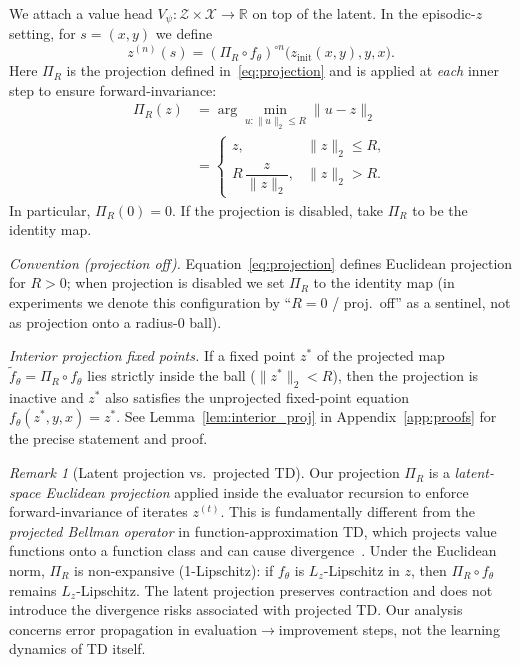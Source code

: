 \documentclass{article}
\theoremstyle{plain}
\theoremstyle{definition}
\theoremstyle{remark}
\newtheorem{remark}[theorem]{Remark}
\newcommand{\R}{\mathbb{R}}
\newcommand{\XX}{\mathcal{X}}
\newcommand{\ZZ}{\mathcal{Z}}
\begin{document}
{We attach a value head $V_\psi:\ZZ\times\XX\to\R$ on top of the latent.
In the episodic-$z$ setting, for $s=(x,y)$ we define
\begin{equation}
    z^{(n)}(s)
    =
    (\Pi_R \circ f_\theta)^{\circ n}\bigl(z_{\mathrm{init}}(x,y),y,x\bigr).
\end{equation}
Here $\Pi_R$ is the projection defined in~\eqref{eq:projection} and is applied at \emph{each} inner step to ensure forward-invariance:
\begin{equation}
\begin{split}
\Pi_R(z) &= \arg\min_{u:\|u\|_2\le R}\|u-z\|_2 \\
&=
\begin{cases}
z, & \|z\|_2 \le R,\\[2pt]
R\,\dfrac{z}{\|z\|_2}, & \|z\|_2 > R.
\end{cases}
\end{split}
\label{eq:projection}
\end{equation}
In particular, $\Pi_R(0)=0$.
If the projection is disabled, take $\Pi_R$ to be the identity map.

\noindent\emph{Convention (projection off).} Equation~\eqref{eq:projection} defines Euclidean projection for $R>0$; when projection is disabled we set $\Pi_R$ to the identity map (in experiments we denote this configuration by ``$R{=}0$ / proj.\ off'' as a sentinel, not as projection onto a radius-$0$ ball).

\emph{Interior projection fixed points.}
If a fixed point $z^*$ of the projected map $\tilde f_\theta = \Pi_R \circ f_\theta$ lies strictly inside the ball ($\|z^*\|_2 < R$), then the projection is inactive and $z^*$ also satisfies the unprojected fixed-point equation $f_\theta(z^*,y,x) = z^*$.
See Lemma~\ref{lem:interior_proj} in Appendix~\ref{app:proofs} for the precise statement and proof.

\begin{remark}[Latent projection vs.\ projected TD]
\label{rem:projection_distinction}
Our projection $\Pi_R$ is a \emph{latent-space Euclidean projection} applied inside the evaluator recursion to enforce forward-invariance of iterates $z^{(t)}$.
This is fundamentally different from the \emph{projected Bellman operator} in function-approximation TD, which projects value functions onto a function class and can cause divergence~\citep{Baird1995Residual,TsitsiklisVanRoy1997}.
Under the Euclidean norm, $\Pi_R$ is non-expansive (1-Lipschitz): if $f_\theta$ is $L_z$-Lipschitz in $z$, then $\Pi_R\circ f_\theta$ remains $L_z$-Lipschitz.
The latent projection preserves contraction and does not introduce the divergence risks associated with projected TD.
Our analysis concerns error propagation in evaluation$\rightarrow$improvement steps, not the learning dynamics of TD itself.
\end{remark}

}
\end{document}
